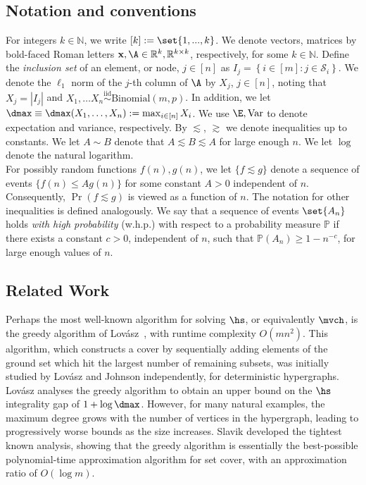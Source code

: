 \subsection{Notation and conventions}\label{sec:notation}
For integers $k \in \mathbb{N}$, we write $[k]:=\set{1,...,k}$. We denote vectors, matrices by bold-faced Roman letters $\mathbf{x}, \A \in \mathbb{R}^k, \mathbb{R}^{k \times k}$, respectively, for some $k \in \mathbb{N}$. Define the \emph{inclusion set} of an element, or node, $j \in [n]$ as $I_j = \left\{i \in [m] : j \in \mathcal{S}_i \right\}$. We denote the $\ell_1$ norm of the $j$-th column of $\A$ by $X_j$, $j\in [n]$, noting that $X_j = |I_j|$ and $X_1, \ldots X_n \overset{\text{iid}}{\sim} \mathrm{Binomial}(m, p)$. In addition, we let $\dmax \equiv \dmax(X_1, \ldots, X_n) := \max_{i \in [n]} X_i$. We use $\E, \text{Var}$ to denote expectation and variance, respectively. By $\lesssim$, $\gtrsim$ we denote inequalities up to constants. We let $A \sim B$ denote that $A \lesssim B \lesssim A$ for large enough $n$. We let $\log$ denote the natural logarithm. \\ For possibly random functions \(f(n), g(n)\), we let \(\{f \lesssim g\}\) denote a sequence of events \(\{f(n) \leq A g(n)\}\) for some constant \(A > 0\) independent of \(n\). Consequently, \(\Pr(f \lesssim g)\) is viewed as a function of \(n\). The notation for other inequalities is defined analogously. 
\noindent
We say that a sequence of events $\set{A_n}$ holds \emph{with high probability} (w.h.p.) with respect to a probability measure $\mathbb{P}$ if there exists a constant $c > 0$, independent of $n$, such that $\mathbb{P}(A_n) \geq 1-n^{-c}$, for large enough values of $n$.

\subsection{Related Work}\label{sec:related work}
Perhaps the most well-known algorithm for solving $\hs$, or equivalently $\mvch$, is the greedy algorithm of Lovász~\cite{lovasz1975ratio}, with runtime complexity $O(mn^2)$. This algorithm, which constructs a cover by sequentially adding elements of the ground set which hit the largest number of remaining subsets, was initially studied by Lovász \cite{lovasz1975ratio} and Johnson \cite{johnson1973approximation} independently, for deterministic hypergraphs. Lovász analyses the greedy algorithm to obtain an upper bound on the $\hs$ integrality gap of $1+\log \dmax$. However, for many natural examples, the maximum degree grows with the number of vertices in the hypergraph, leading to progressively worse bounds as the size increases. Slavik \cite{slavik1996tight} developed the tightest known analysis, showing that the greedy algorithm is essentially the best-possible polynomial-time approximation algorithm for set cover, with an approximation ratio of $O(\log m)$.

